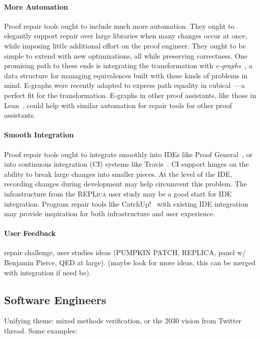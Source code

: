 \paragraph{More Automation}
Proof repair tools ought to include much more automation.
They ought to elegantly support repair over large libraries when many changes occur at once,
while imposing little additional effort on the proof engineer.
They ought to be simple to extend with new optimizations, all while preserving correctness.
One promising path to these ends is integrating the \toolnamec transformation with \textit{e-graphs}~\cite{egraph1},
a data structure %
for managing equivalences
built with these kinds of problems in mind.
E-graphs were recently adapted to express path equality in cubical~\cite{egraph6}---a perfect fit for the \toolnamec transformation.
E-graphs in other proof assistants, like those in Lean~\cite{selsam:lean}, could help with similar automation for repair tools for other proof assistants.

\paragraph{Smooth Integration}
Proof repair tools ought to integrate smoothly into IDEs like Proof General~\cite{proofgeneral},
or into continuous integration (CI) systems like Travis~\cite{travis}.
CI support hinges on the ability to break large changes into smaller pieces.
At the level of the IDE, recording changes during development may help circumvent this problem.
The infrastructure from the \textsc{REPLica} user study may be a good start for IDE integration.
Program repair tools like CatchUp!~\cite{Henkel:2005:CCR:1062455.1062512} with existing IDE integration may provide inspiration
for both infrastructure and user experience.

\paragraph{User Feedback} repair challenge, user studies ideas (PUMPKIN PATCH, REPLICA, panel w/ Benjamin Pierce, QED at large). (maybe look for more ideas, this can be merged with integration if need be).

\subsection*{Software Engineers}

Unifying theme: mixed methods verification, or the 2030 vision from Twitter thread. Some examples:

